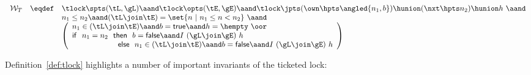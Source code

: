 \begin{definition} 
\label{def:tlock}
\[
\begin{array}{rcl} 
{\cal W}_T &\eqdef & \tlock \spts (\tL, \gL) \aand \tlock \opts (\tE, \gE) \aand 
\tlock \jpts (\own \hpts \angled{n_1, b}) \hunion (\nxt \hpts n_2) \hunion h ~ \aand \\ 
&& n_1 \le n_2 \aand (\tL \join \tE) = \set{n ~|~ n_1 \le n < n_2} ~\aand \\
&& 
\left(\begin{array}{l}
n_1 \in (\tL \join \tE) \aand b = \mathsf{true} \aand h = \hempty ~\oor \\
\mathsf{if}~~ n_1 = n_2 ~~\mathsf{then}~~ b = \mathsf{false} \aand I\
(\gL \join \gE)\ h \\
~~~~~~~~~~~~~~~~~~\mathsf{else}~~n_1 \in (\tL \join \tE) \aand b = \mathsf{false} \aand I~(\gL \join \gE)\ h
\end{array}\right)
\end{array}
\]
\end{definition}

Definition~\ref{def:tlock} highlights a number of important invariants
of the ticketed lock:

